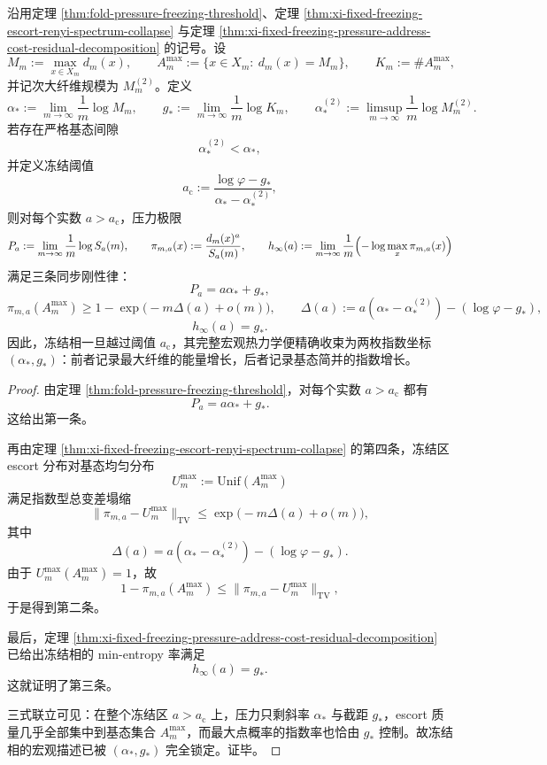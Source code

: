 \begin{theorem}[冻结相宏观热力学的双指数坐标化]\label{thm:xi-time-part9xf-frozen-phase-two-coordinate-thermodynamics}
沿用定理 \ref{thm:fold-pressure-freezing-threshold}、定理 \ref{thm:xi-fixed-freezing-escort-renyi-spectrum-collapse} 与定理 \ref{thm:xi-fixed-freezing-pressure-address-cost-residual-decomposition} 的记号。设
\[
M_m:=\max_{x\in X_m}d_m(x),
\qquad
A_m^{\max}:=\{x\in X_m:\ d_m(x)=M_m\},
\qquad
K_m:=\#A_m^{\max},
\]
并记次大纤维规模为 \(M_m^{(2)}\)。定义
\[
\alpha_*:=\lim_{m\to\infty}\frac1m\log M_m,
\qquad
g_*:=\lim_{m\to\infty}\frac1m\log K_m,
\qquad
\alpha_*^{(2)}:=\limsup_{m\to\infty}\frac1m\log M_m^{(2)}.
\]
若存在严格基态间隙
\[
\alpha_*^{(2)}<\alpha_*,
\]
并定义冻结阈值
\[
a_{\mathrm c}:=\frac{\log\varphi-g_*}{\alpha_*-\alpha_*^{(2)}},
\]
则对每个实数 \(a>a_{\mathrm c}\)，压力极限
\[
P_a:=\lim_{m\to\infty}\frac1m\log S_a(m),
\qquad
\pi_{m,a}(x):=\frac{d_m(x)^a}{S_a(m)},
\qquad
h_\infty(a):=\lim_{m\to\infty}\frac1m\Bigl(-\log\max_x\pi_{m,a}(x)\Bigr)
\]
满足三条同步刚性律：
\[
P_a=a\alpha_*+g_*,
\]
\[
\pi_{m,a}(A_m^{\max})
\ge
1-\exp\!\bigl(-m\Delta(a)+o(m)\bigr),
\qquad
\Delta(a):=a(\alpha_*-\alpha_*^{(2)})-(\log\varphi-g_*),
\]
\[
h_\infty(a)=g_*.
\]
因此，冻结相一旦越过阈值 \(a_{\mathrm c}\)，其完整宏观热力学便精确收束为两枚指数坐标 \((\alpha_*,g_*)\)：前者记录最大纤维的能量增长，后者记录基态简并的指数增长。
\end{theorem}
\begin{proof}
由定理 \ref{thm:fold-pressure-freezing-threshold}，对每个实数 \(a>a_{\mathrm c}\) 都有
\[
P_a=a\alpha_*+g_*.
\]
这给出第一条。

再由定理 \ref{thm:xi-fixed-freezing-escort-renyi-spectrum-collapse} 的第四条，冻结区 escort 分布对基态均匀分布
\[
U_m^{\max}:=\mathrm{Unif}(A_m^{\max})
\]
满足指数型总变差塌缩
\[
\|\pi_{m,a}-U_m^{\max}\|_{\mathrm{TV}}
\le
\exp\!\bigl(-m\Delta(a)+o(m)\bigr),
\]
其中
\[
\Delta(a)=a(\alpha_*-\alpha_*^{(2)})-(\log\varphi-g_*).
\]
由于 \(U_m^{\max}(A_m^{\max})=1\)，故
\[
1-\pi_{m,a}(A_m^{\max})
\le
\|\pi_{m,a}-U_m^{\max}\|_{\mathrm{TV}},
\]
于是得到第二条。

最后，定理 \ref{thm:xi-fixed-freezing-pressure-address-cost-residual-decomposition} 已给出冻结相的 min-entropy 率满足
\[
h_\infty(a)=g_*.
\]
这就证明了第三条。

三式联立可见：在整个冻结区 \(a>a_{\mathrm c}\) 上，压力只剩斜率 \(\alpha_*\) 与截距 \(g_*\)，escort 质量几乎全部集中到基态集合 \(A_m^{\max}\)，而最大点概率的指数率也恰由 \(g_*\) 控制。故冻结相的宏观描述已被 \((\alpha_*,g_*)\) 完全锁定。证毕。
\end{proof}


